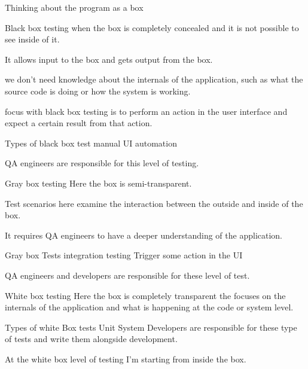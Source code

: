 Thinking about the program as a box 

Black box testing  
  when the box is completely concealed and it is not possible to see inside of it.

  It allows input to the box and gets output from the box. 

  we don't need knowledge about the internals of the application, 
  such as what the source code is doing or how the system is working.

  focus with black box testing is to perform an action in the user interface
   and expect a certain result from that action.

  Types of black box test 
    manual 
    UI automation 

  QA engineers are responsible for this level of testing.  


Gray box testing 
  Here the box is semi-transparent. 

  Test scenarios here examine the interaction between the outside and inside of the box.

  It requires QA engineers to have a deeper understanding of the application.

  Gray box Tests 
    integration testing
    Trigger some action in the UI 

  QA engineers and developers are responsible for these level of test.


White box testing 
  Here the box is completely transparent 
  the focuses on the internals of the application 
  and what is happening at the code or system level.

  Types of white Box tests
  Unit 
  System 
  Developers are responsible for these type of tests and write them alongside development.

  At the white box level of testing I'm starting from inside the box.